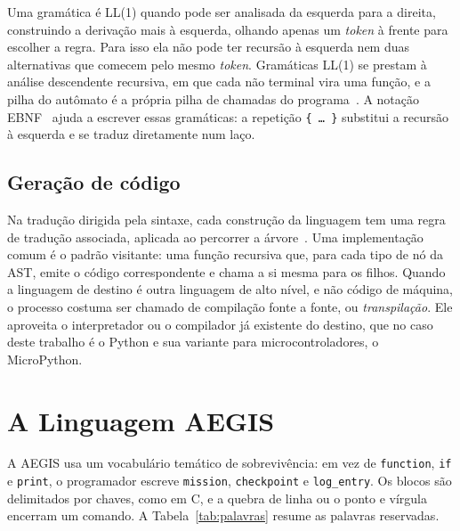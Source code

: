 \documentclass[conference]{IEEEtran}
\begin{document}
Uma gramática é LL(1) quando pode ser analisada da esquerda para a
direita, construindo a derivação mais à esquerda, olhando apenas um
\textit{token} à frente para escolher a regra. Para isso ela não pode
ter recursão à esquerda nem duas alternativas que comecem pelo mesmo
\textit{token}. Gramáticas LL(1) se prestam à análise descendente
recursiva, em que cada não terminal vira uma função, e a pilha do
autômato é a própria pilha de chamadas do programa~\cite{aho2007}. A
notação EBNF~\cite{iso14977} ajuda a escrever essas gramáticas: a repetição
\texttt{\{ \dots\ \}} substitui a recursão à esquerda e se traduz
diretamente num laço.

\subsection{Geração de código}
Na tradução dirigida pela sintaxe, cada construção da linguagem tem uma
regra de tradução associada, aplicada ao percorrer a
árvore~\cite{aho2007}. Uma implementação comum é o padrão visitante: uma
função recursiva que, para cada tipo de nó da AST, emite o código
correspondente e chama a si mesma para os filhos. Quando a linguagem de
destino é outra linguagem de alto nível, e não código de máquina, o
processo costuma ser chamado de compilação fonte a fonte, ou
\textit{transpilação}. Ele aproveita o interpretador ou o compilador
já existente do destino, que no caso deste trabalho é o Python e sua variante
para microcontroladores, o MicroPython.

\section{A Linguagem AEGIS}
\label{sec:linguagem}

A AEGIS usa um vocabulário temático de sobrevivência: em vez de
\texttt{function}, \texttt{if} e \texttt{print}, o programador escreve
\texttt{mission}, \texttt{checkpoint} e \texttt{log\_entry}. Os blocos são
delimitados por chaves, como em C, e a quebra de linha ou o ponto e vírgula
encerram um comando. A Tabela~\ref{tab:palavras} resume as palavras
reservadas.
\end{document}
